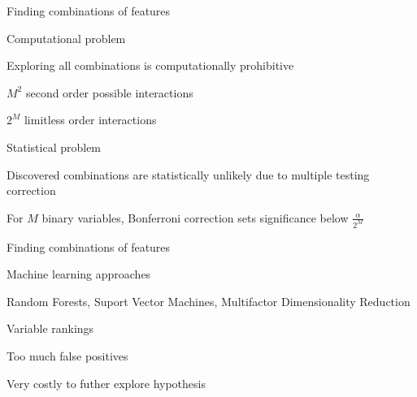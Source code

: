 \documentclass[ignorenonframetext,]{beamer}
\begin{document}
\begin{frame}{Finding combinations of features}

\begin{block}{Computational problem}

Exploring all combinations is computationally prohibitive

\pause

\(M^2\) second order possible interactions

\pause

\(2^M\) limitless order interactions

\pause

\end{block}

\begin{block}{Statistical problem}

Discovered combinations are statistically unlikely due to multiple
testing correction

\pause

For \(M\) binary variables, Bonferroni correction sets significance
below \(\frac{\alpha}{2^M}\)

\end{block}

\end{frame}

\begin{frame}{Finding combinations of features}

\begin{block}{Machine learning approaches}

Random Forests, Suport Vector Machines, Multifactor Dimensionality
Reduction

\pause

Variable rankings

\pause

Too much false positives

\pause

Very costly to futher explore hypothesis

\end{block}

\end{frame}
\end{document}
